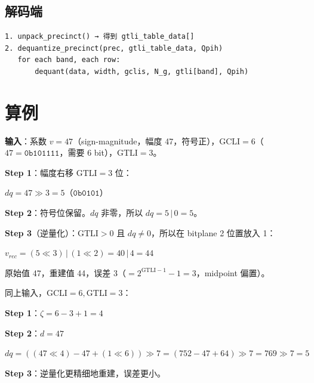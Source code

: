 \subsection{解码端}

\begin{lstlisting}[numbers=none]
1. unpack_precinct() → 得到 gtli_table_data[]
2. dequantize_precinct(prec, gtli_table_data, Qpih)
   for each band, each row:
       dequant(data, width, gclis, N_g, gtli[band], Qpih)
\end{lstlisting}

\section{算例}

\begin{examplebox}[title={Dead-Zone 量化示例}]

\textbf{输入}：系数 $v = 47$（sign-magnitude，幅度 47，符号正），$\mathrm{GCLI} = 6$（$47 = \texttt{0b101111}$，需要 6 bit），$\mathrm{GTLI} = 3$。

\medskip
\textbf{Step 1}：幅度右移 $\mathrm{GTLI} = 3$ 位：

$\mathit{dq} = 47 \gg 3 = 5$（$\texttt{0b0101}$）

\textbf{Step 2}：符号位保留。$\mathit{dq}$ 非零，所以 $\mathit{dq} = 5 \,|\, 0 = 5$。

\textbf{Step 3}（逆量化）：$\mathrm{GTLI} > 0$ 且 $\mathit{dq} \neq 0$，所以在 bitplane 2 位置放入 1：

$v_{\mathit{rec}} = (5 \ll 3) \,|\, (1 \ll 2) = 40 \,|\, 4 = 44$

原始值 47，重建值 44，误差 3（$= 2^{\mathrm{GTLI}-1} - 1 = 3$，midpoint 偏置）。
\end{examplebox}

\begin{examplebox}[title={Uniform 量化示例}]

同上输入，$\mathrm{GCLI} = 6, \mathrm{GTLI} = 3$：

\textbf{Step 1}：$\zeta = 6 - 3 + 1 = 4$

\textbf{Step 2}：$d = 47$

$\mathit{dq} = ((47 \ll 4) - 47 + (1 \ll 6)) \gg 7 = (752 - 47 + 64) \gg 7 = 769 \gg 7 = 5$

\textbf{Step 3}：逆量化更精细地重建，误差更小。
\end{examplebox}

